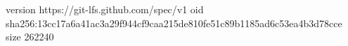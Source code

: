 version https://git-lfs.github.com/spec/v1
oid sha256:13cc17a6a41ac3a29f944cf9caa215de810fe51c89b1185ad6c53ea4b3d78cce
size 262240
